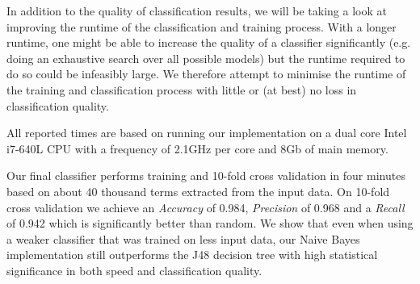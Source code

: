 In addition to the quality of classification results, we will be taking a look at improving the runtime of the classification and training process.
With a longer runtime, one might be able to increase the quality of a classifier  significantly (e.g. doing an exhaustive search over all possible models) but the runtime required to do so could be infeasibly large. We therefore attempt to minimise the runtime of the training and classification process with little or (at best) no loss in classification quality.

All reported times are based on running our implementation on a dual core Intel i7-640L CPU with a frequency of 2.1GHz per core and 8Gb of main memory.

Our final classifier performs training and 10-fold cross validation in four minutes based on about 40 thousand terms extracted from the input data.
On 10-fold cross validation we achieve an \emph{Accuracy} of 0.984, \emph{Precision} of 0.968 and a \emph{Recall} of 0.942 which is significantly better than random.
We show that even when using a weaker classifier that was trained on less input data, our Naive Bayes implementation still outperforms the J48 decision tree with high statistical significance in both speed and classification quality.

